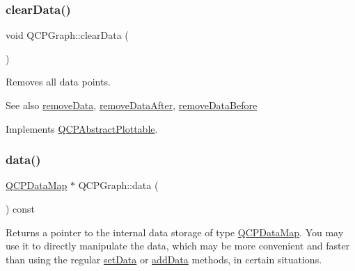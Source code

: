 \subsubsection{\texorpdfstring{clear\+Data()}{clearData()}}
{\footnotesize\ttfamily void Q\+C\+P\+Graph\+::clear\+Data (\begin{DoxyParamCaption}{ }\end{DoxyParamCaption})\hspace{0.3cm}{\ttfamily [virtual]}}

Removes all data points. \begin{DoxySeeAlso}{See also}
\mbox{\hyperlink{class_q_c_p_graph_a4a0fde50b7db9db0a85b5c5b6b10098f}{remove\+Data}}, \mbox{\hyperlink{class_q_c_p_graph_ae42d645ef617cfc75fc0df58e62c522a}{remove\+Data\+After}}, \mbox{\hyperlink{class_q_c_p_graph_a9fe0b3e54e8c7b61319bd03337e21e99}{remove\+Data\+Before}} 
\end{DoxySeeAlso}


Implements \mbox{\hyperlink{class_q_c_p_abstract_plottable_a86e5b8fd4b6ff4f4084e7ea4c573fc53}{Q\+C\+P\+Abstract\+Plottable}}.

\mbox{\label{class_q_c_p_graph_acde1c0d1f6a817930489548396e6b3e6}} 
\subsubsection{\texorpdfstring{data()}{data()}}
{\footnotesize\ttfamily \mbox{\hyperlink{qcustomplot_8h_a84a9c4a4c2216ccfdcb5f3067cda76e3}{Q\+C\+P\+Data\+Map}} $\ast$ Q\+C\+P\+Graph\+::data (\begin{DoxyParamCaption}{ }\end{DoxyParamCaption}) const\hspace{0.3cm}{\ttfamily [inline]}}

Returns a pointer to the internal data storage of type \mbox{\hyperlink{qcustomplot_8h_a84a9c4a4c2216ccfdcb5f3067cda76e3}{Q\+C\+P\+Data\+Map}}. You may use it to directly manipulate the data, which may be more convenient and faster than using the regular \mbox{\hyperlink{class_q_c_p_graph_a1df2fd710545c8ba3b2c99a39a27bf8b}{set\+Data}} or \mbox{\hyperlink{class_q_c_p_graph_aa5c6181d84db72ce4dbe9dc15a34ef4f}{add\+Data}} methods, in certain situations. \mbox{\label{class_q_c_p_graph_ae6425d5df537c08159f794cb18c051c3}} 
